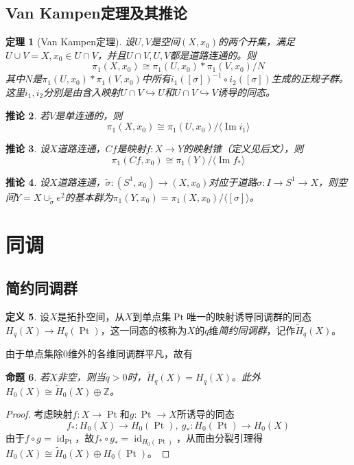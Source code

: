 \documentclass[UTF-8,11pt,fancyhdr,hyperref,titlepage]{ctexart}
\newcommand{\red}{\color{red}}
\theoremstyle{question}
\theoremstyle{theorem}
\newtheorem{thm}{定理}
\newtheorem{cor}[thm]{推论}
\newtheorem{prop}[thm]{命题}
\theoremstyle{definition}
\newtheorem{defn}[thm]{定义}
\theoremstyle{remark}
\def\ZZ{{\mathbb Z}}
\def\<{\langle}
\def\>{\rangle}
\def\longto{\longrightarrow}
\def\To{\longto}
\newcommand{\rH}[1]{\widetilde{H}_{#1}}
\DeclareMathOperator{\im}{Im}
\DeclareMathOperator{\id}{id}
\DeclareMathOperator{\Pt}{Pt}
\begin{document}
\subsection{Van Kampen定理及其推论}
\begin{thm}[{{\red Van Kampen定理}}]\label{VK}
  设$U,V$是空间$(X,x_0)$的两个开集，满足$U\cup V=X, x_0\in U\cap V$，并且$U\cap V, U,V$都是道路连通的。则
  \begin{equation*}
    \pi_1(X,x_0)\cong\pi_1(U,x_0)\ast\pi_1(V,x_0)/N
  \end{equation*}
  其中$N$是$\pi_1(U,x_0)\ast\pi_1(V,x_0)$中所有$i_1([\sigma])^{-1}\circ i_2([\sigma])$生成的正规子群。这里$i_1,i_2$分别是由含入映射$U\cap V\hookrightarrow U$和$U\cap V\hookrightarrow V$诱导的同态。
\end{thm}
\begin{cor}\label{VK单连通}
  若$V$是单连通的，则
  \begin{equation*}
    \pi_1(X,x_0)\cong\pi_1(U,x_0)/\<\im i_1\>
  \end{equation*}
\end{cor}
\begin{cor}\label{VKCf}
  设$X$道路连通，$Cf$是映射$f\colon X\To Y$的映射锥（定义见后文），则
  \begin{equation*}
    \pi_1(Cf,x_0)\cong\pi_1(Y)/\<\im f_{\ast}\>
  \end{equation*}
\end{cor}
\begin{cor}\label{VKS^1}
  设$X$道路连通，$\widetilde{\sigma}\colon(S^1,x_0)\To(X,x_0)$对应于道路$\sigma\colon I\To S^1\To X$，则空间$Y=X\cup_{\widetilde{\sigma}}e^2$的基本群为$\pi_1(Y,x_0)=\pi_1(X,x_0)/\<[\sigma]\>$。
\end{cor}

\section{同调}
\subsection{简约同调群}
\begin{defn}
  设$X$是拓扑空间，从$X$到单点集$\Pt$唯一的映射诱导同调群的同态$H_q(X)\To H_q(\Pt)$，这一同态的核称为$X$的$q$维\emph{\red 简约同调群}，记作$\rH{q}(X)$。
\end{defn}
由于单点集除$0$维外的各维同调群平凡，故有
\begin{prop}\label{简约同调群}
  若$X$非空，则当$q>0$时，$\rH{q}(X)=H_q(X)$。此外$H_0(X)\cong\rH{0}(X)\oplus\ZZ$。
\end{prop}
\begin{proof}
  考虑映射$f\colon X\To\Pt$和$g\colon\Pt\To X$所诱导的同态
  \begin{equation*}
    f_{\ast}\colon H_0(X)\To H_0(\Pt),\ g_{\ast}\colon H_0(\Pt)\To H_0(X)
  \end{equation*}
  由于$f\circ g=\id_{\Pt}$，故$f_{\ast}\circ g_{\ast}=\id_{H_0(\Pt)}$，从而由分裂引理得$H_0(X)\cong\rH{0}(X)\oplus H_0(\Pt)$。
\end{proof}
\end{document}
